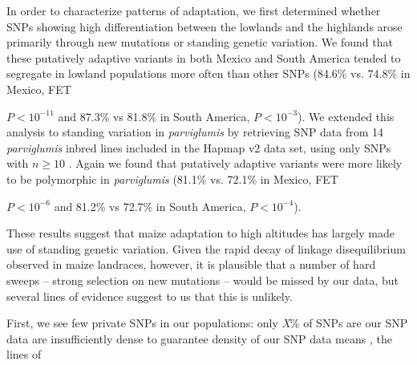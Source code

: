 In order to characterize patterns of adaptation, we first determined whether  SNPs showing high differentiation between the lowlands and the highlands arose primarily through new mutations or standing genetic variation.  
We found that these putatively adaptive variants in both Mexico and South America tended to segregate in lowland populations more often than other SNPs (84.6\% vs. 74.8\% in Mexico, FET {$P < 10^{-11}$ and 87.3\% vs 81.8\% in South America,  $P< 10^{-3}$).  We extended this analysis to standing variation in \emph{parviglumis} by retrieving SNP data from 14 \emph{parviglumis} inbred lines included in the Hapmap v2 data set, using only SNPs with $n\geq10$ \cite[]{Hufford_2012_22660546}.  Again we found that putatively adaptive variants were more likely to be polymorphic in \emph{parviglumis} (81.1\% vs. 72.1\% in Mexico, FET {$P < 10^{-6}$ and 81.2\% vs 72.7\% in South America,  $P< 10^{-4}$).  

These results suggest that maize adaptation to high altitudes has largely made use of standing genetic variation. 
Given the rapid decay of linkage disequilibrium observed in maize landraces, however, it is plausible that a number of hard sweeps -- strong selection on new mutations -- would be missed by our data, but several lines of evidence suggest to us that this is unlikely.  

First, we see few private SNPs in our populations: only \emph{\color{red} X}\% of SNPs are  our SNP data are insufficiently dense to guarantee  density of our SNP data means , the lines of 


}}
